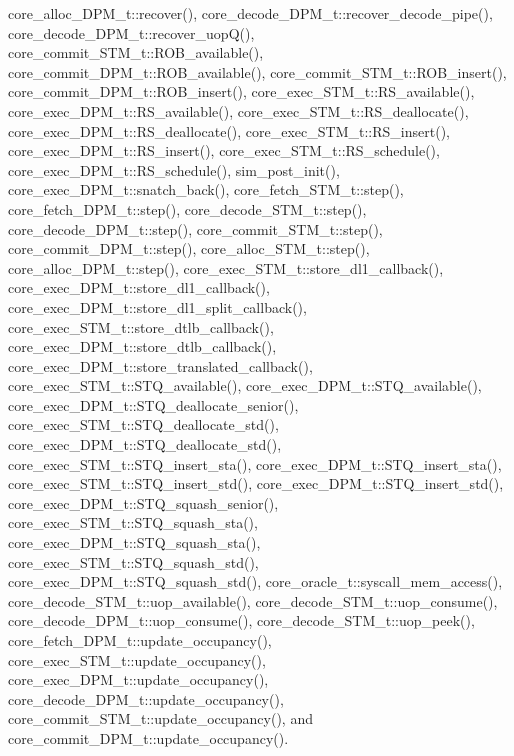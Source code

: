 core\_\-alloc\_\-DPM\_\-t::recover(), core\_\-decode\_\-DPM\_\-t::recover\_\-decode\_\-pipe(), core\_\-decode\_\-DPM\_\-t::recover\_\-uopQ(), core\_\-commit\_\-STM\_\-t::ROB\_\-available(), core\_\-commit\_\-DPM\_\-t::ROB\_\-available(), core\_\-commit\_\-STM\_\-t::ROB\_\-insert(), core\_\-commit\_\-DPM\_\-t::ROB\_\-insert(), core\_\-exec\_\-STM\_\-t::RS\_\-available(), core\_\-exec\_\-DPM\_\-t::RS\_\-available(), core\_\-exec\_\-STM\_\-t::RS\_\-deallocate(), core\_\-exec\_\-DPM\_\-t::RS\_\-deallocate(), core\_\-exec\_\-STM\_\-t::RS\_\-insert(), core\_\-exec\_\-DPM\_\-t::RS\_\-insert(), core\_\-exec\_\-STM\_\-t::RS\_\-schedule(), core\_\-exec\_\-DPM\_\-t::RS\_\-schedule(), sim\_\-post\_\-init(), core\_\-exec\_\-DPM\_\-t::snatch\_\-back(), core\_\-fetch\_\-STM\_\-t::step(), core\_\-fetch\_\-DPM\_\-t::step(), core\_\-decode\_\-STM\_\-t::step(), core\_\-decode\_\-DPM\_\-t::step(), core\_\-commit\_\-STM\_\-t::step(), core\_\-commit\_\-DPM\_\-t::step(), core\_\-alloc\_\-STM\_\-t::step(), core\_\-alloc\_\-DPM\_\-t::step(), core\_\-exec\_\-STM\_\-t::store\_\-dl1\_\-callback(), core\_\-exec\_\-DPM\_\-t::store\_\-dl1\_\-callback(), core\_\-exec\_\-DPM\_\-t::store\_\-dl1\_\-split\_\-callback(), core\_\-exec\_\-STM\_\-t::store\_\-dtlb\_\-callback(), core\_\-exec\_\-DPM\_\-t::store\_\-dtlb\_\-callback(), core\_\-exec\_\-DPM\_\-t::store\_\-translated\_\-callback(), core\_\-exec\_\-STM\_\-t::STQ\_\-available(), core\_\-exec\_\-DPM\_\-t::STQ\_\-available(), core\_\-exec\_\-DPM\_\-t::STQ\_\-deallocate\_\-senior(), core\_\-exec\_\-STM\_\-t::STQ\_\-deallocate\_\-std(), core\_\-exec\_\-DPM\_\-t::STQ\_\-deallocate\_\-std(), core\_\-exec\_\-STM\_\-t::STQ\_\-insert\_\-sta(), core\_\-exec\_\-DPM\_\-t::STQ\_\-insert\_\-sta(), core\_\-exec\_\-STM\_\-t::STQ\_\-insert\_\-std(), core\_\-exec\_\-DPM\_\-t::STQ\_\-insert\_\-std(), core\_\-exec\_\-DPM\_\-t::STQ\_\-squash\_\-senior(), core\_\-exec\_\-STM\_\-t::STQ\_\-squash\_\-sta(), core\_\-exec\_\-DPM\_\-t::STQ\_\-squash\_\-sta(), core\_\-exec\_\-STM\_\-t::STQ\_\-squash\_\-std(), core\_\-exec\_\-DPM\_\-t::STQ\_\-squash\_\-std(), core\_\-oracle\_\-t::syscall\_\-mem\_\-access(), core\_\-decode\_\-STM\_\-t::uop\_\-available(), core\_\-decode\_\-STM\_\-t::uop\_\-consume(), core\_\-decode\_\-DPM\_\-t::uop\_\-consume(), core\_\-decode\_\-STM\_\-t::uop\_\-peek(), core\_\-fetch\_\-DPM\_\-t::update\_\-occupancy(), core\_\-exec\_\-STM\_\-t::update\_\-occupancy(), core\_\-exec\_\-DPM\_\-t::update\_\-occupancy(), core\_\-decode\_\-DPM\_\-t::update\_\-occupancy(), core\_\-commit\_\-STM\_\-t::update\_\-occupancy(), and core\_\-commit\_\-DPM\_\-t::update\_\-occupancy().
